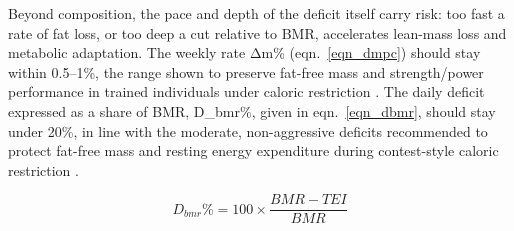 Beyond composition, the pace and depth of the deficit itself carry risk: too fast a rate of fat loss, or too deep a cut relative to BMR, accelerates lean-mass loss and metabolic adaptation. The weekly rate Δm\% (eqn.~\eqref{eqn_dmpc}) should stay within 0.5–1\%, the range shown to preserve fat-free mass and strength/power performance in trained individuals under caloric restriction \cite{ref_garthe2011}. The daily deficit expressed as a share of BMR, D\_bmr\%, given in eqn.~\eqref{eqn_dbmr}, should stay under 20\%, in line with the moderate, non-aggressive deficits recommended to protect fat-free mass and resting energy expenditure during contest-style caloric restriction \cite{ref_helms2014prep}.

\begin{equation}
\label{eqn_dbmr}
D_{bmr}\% = 100 × \frac{BMR - TEI}{BMR}
\end{equation}
